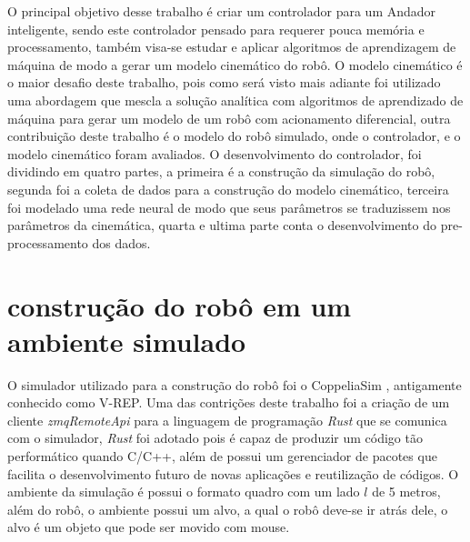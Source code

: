 
\label{Cap:Desenvolvimento}

O principal objetivo desse trabalho é criar um controlador para
um Andador inteligente, sendo este controlador pensado para requerer
pouca memória e processamento, também visa-se estudar e aplicar algoritmos
de aprendizagem de máquina de modo a gerar um modelo cinemático do robô.
O modelo cinemático é o maior desafio deste trabalho, pois como será visto
mais adiante foi utilizado uma abordagem que mescla a solução analítica com
algoritmos de aprendizado de máquina para gerar um modelo de um robô com
acionamento diferencial, outra contribuição deste trabalho é o modelo do
robô simulado, onde o controlador, e o modelo cinemático foram avaliados.
O desenvolvimento do controlador, foi dividindo em quatro partes, a primeira
é a construção da simulação do robô, segunda foi a coleta de dados para
a construção do modelo cinemático, terceira foi  modelado
uma rede neural de modo que seus parâmetros se traduzissem nos parâmetros
da cinemática, quarta e ultima parte conta o desenvolvimento
do pre-processamento dos dados. 


\section{construção do robô em um ambiente simulado}
O simulador utilizado para a construção do robô foi o CoppeliaSim
\cite{rooban2021coppeliasim}, antigamente conhecido como V-REP.
Uma das contrições deste trabalho foi a criação de um cliente 
\textit{zmqRemoteApi} para a linguagem de programação \textit{Rust}
que se comunica com o simulador, \textit{Rust} foi adotado pois
é capaz de produzir um código tão performático quando C/C++, além
de possui um gerenciador de pacotes que facilita o desenvolvimento
futuro de novas aplicações e reutilização de códigos. O ambiente
da simulação é possui o formato quadro com um lado $l$ de 5 metros,
além do robô, o ambiente possui um alvo, a qual o robô deve-se ir
atrás dele, o alvo é um objeto que pode ser movido com mouse. 


